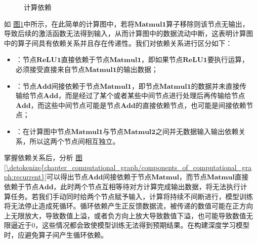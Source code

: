 \documentclass[letterpaper,10pt,english]{sphinxmanual}
\let\sphinxpxdimen\pdfpxdimen\else\newdimen\sphinxpxdimen
\begin{document}
\begin{figure}[H]
\centering
\capstart

\noindent\sphinxincludegraphics[width=400\sphinxpxdimen]{{dependence}.svg}
\caption{计算依赖}\label{\detokenize{chapter_computational_graph/components_of_computational_graph:id10}}\label{\detokenize{chapter_computational_graph/components_of_computational_graph:dependence}}\end{figure}

\sphinxAtStartPar
如
\hyperref[\detokenize{chapter_computational_graph/components_of_computational_graph:dependence}]{图\ref{\detokenize{chapter_computational_graph/components_of_computational_graph:dependence}}}中所示，在此简单的计算图中，若将\(\mathbf{Matmul1}\)算子移除则该节点无输出，导致后续的激活函数无法得到输入，从而计算图中的数据流动中断，这表明计算图中的算子间具有依赖关系并且存在传递性。我们对依赖关系进行区分如下：
\begin{itemize}
\item {} 
\sphinxAtStartPar
{}：节点\(\mathbf{ReLU1}\)直接依赖于节点\(\mathbf{Matmul1}\)，即如果节点\(\mathbf{ReLU1}\)要执行运算，必须接受直接来自节点\(\mathbf{Matmul1}\)的输出数据；

\item {} 
\sphinxAtStartPar
{}：节点\(\mathbf{Add}\)间接依赖于节点\(\mathbf{Matmul1}\)，即节点\(\mathbf{Matmul1}\)的数据并未直接传输给节点\(\mathbf{Add}\)，而是经过了某个或者某些中间节点进行处理后再传输给节点\(\mathbf{Add}\)，而这些中间节点可能是节点\(\mathbf{Add}\)的直接依赖节点，也可能是间接依赖节点；

\item {} 
\sphinxAtStartPar
{}：在计算图中节点\(\mathbf{Matmul1}\)与节点\(\mathbf{Matmul2}\)之间并无数据输入输出依赖关系，所以这两个节点间相互独立。

\end{itemize}

\sphinxAtStartPar
掌握依赖关系后，分析
\hyperref[\detokenize{chapter_computational_graph/components_of_computational_graph:recurrent}]{图\ref{\detokenize{chapter_computational_graph/components_of_computational_graph:recurrent}}}可以得出节点\(\mathbf{Add}\)间接依赖于节点\(\mathbf{Matmul}\)，而节点\(\mathbf{Matmul}\)直接依赖于节点\(\mathbf{Add}\)，此时两个节点互相等待对方计算完成输出数据，将无法执行计算任务。若我们手动同时给两个节点赋予输入，计算将持续不间断进行，模型训练将无法停止造成死循环。循环依赖产生正反馈数据流，被传递的数值可能在正方向上无限放大，导致数值上溢，或者负方向上放大导致数值下溢，也可能导致数值无限逼近于0，这些情况都会致使模型训练无法得到预期结果。在构建深度学习模型时，应避免算子间产生循环依赖。
\end{document}
